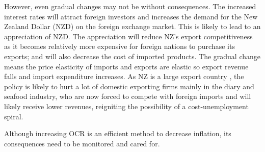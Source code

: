 \documentclass[a4paper,12pt]{article}
\begin{document}
However, even gradual changes may not be without consequences. The increased interest rates will attract foreign investors and increases the demand for the New Zealand Dollar (NZD) on the foreign exchange market. This is likely to lead to an appreciation of NZD. The appreciation will reduce NZ's export competitiveness as it becomes relatively more expensive for foreign nations to purchase its exports; and will also decrease the cost of imported products. The gradual change means the price elasticity of imports and exports are elastic so export revenue falls and import expenditure increases. As NZ is a large export country \parencite{exports}, the policy is likely to hurt a lot of domestic exporting firms mainly in the diary and seafood industry, who are now forced to compete with foreign imports and will likely receive lower revenues, reigniting the possibility of a cost-unemployment spiral.

Although increasing OCR is an efficient method to decrease inflation, its consequences need to be monitored and cared for.




\newpage
\printbibliography
\end{document}
